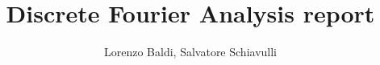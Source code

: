 \documentclass[a4paper,11pt]{article}
\theoremstyle{plain}
\theoremstyle{definition}
\theoremstyle{remark}
\begin{document}
\author{Lorenzo Baldi, Salvatore Schiavulli}
\title{Discrete Fourier Analysis report}
\maketitle
\tableofcontents


%







\printbibliography
\end{document}
